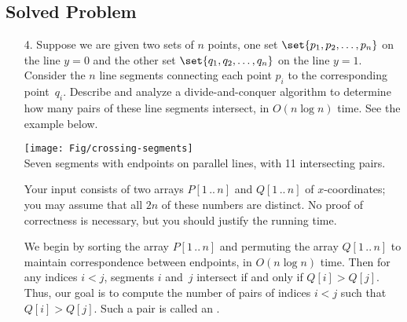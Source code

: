 \documentclass[11pt]{article}
\begin{document}
\subsection*{Solved Problem}

\begin{enumerate}\parindent 1.5em
\item[4.]  Suppose we are given two sets of $n$ points, one set
  $\set{p_1, p_2, \dots, p_n}$ on the line $y=0$ and the other set
  $\set{q_1, q_2, \dots, q_n}$ on the line $y=1$.  Consider the $n$
  line segments connecting each point $p_i$ to the corresponding
  point~$q_i$.  Describe and analyze a divide-and-conquer algorithm to
  determine how many pairs of these line segments intersect, in
  $O(n\log n)$ time.  See the example below.

\begin{center}\footnotesize\sffamily
\texttt{[image: Fig/crossing-segments]}\\
Seven segments with endpoints on parallel lines, with 11 intersecting pairs.
\end{center}

Your input consists of two arrays $P[1\,..\,n]$ and $Q[1\,..\,n]$ of $x$-coordinates; you may assume that all $2n$ of these numbers are distinct.  No proof of correctness is necessary, but you should justify the running time.

\begin{solution}
We begin by sorting the array $P[1\,..\,n]$ and permuting the array $Q[1\,..\,n]$ to maintain correspondence between endpoints, in $O(n\log n)$ time.  Then for any indices $i<j$, segments $i$ and~$j$ intersect if and only if $Q[i] > Q[j]$.  Thus, our goal is to compute the number of pairs of indices $i<j$ such that $Q[i] > Q[j]$.  Such a pair is called an .


\end{solution}
\end{enumerate}
\end{document}
